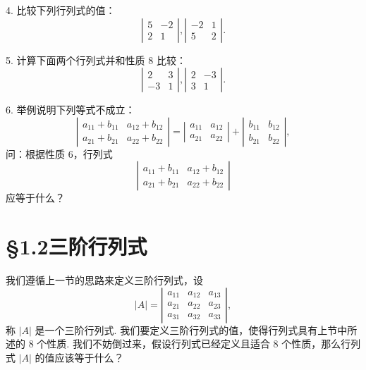 \documentclass[UTF8, 12pt, fontset=fandol, oneside]{ctexart}
\begin{document}
4. 比较下列行列式的值：
\[
\left|\begin{array}{cc}
5 & -2\\
2 & 1
\end{array}\right|,
\left|\begin{array}{cc}
-2 & 1\\
5 & 2
\end{array}\right|.
\]

5. 计算下面两个行列式并和性质 8 比较：
\[
\left|\begin{array}{cc}
2 & 3\\
-3 & 1
\end{array}\right|,
\left|\begin{array}{cc}
2 & -3\\
3 & 1
\end{array}\right|.
\]

6. 举例说明下列等式不成立：
\[
\left|\begin{array}{cc}
a_{11}+b_{11} & a_{12}+b_{12}\\
a_{21}+b_{21} & a_{22}+b_{22}
\end{array}\right|
=
\left|\begin{array}{cc}
a_{11} & a_{12}\\
a_{21} & a_{22}
\end{array}\right|
+
\left|\begin{array}{cc}
b_{11} & b_{12}\\
b_{21} & b_{22}
\end{array}\right|,
\]
问：根据性质 6，行列式
\[
\left|\begin{array}{cc}
a_{11}+b_{11} & a_{12}+b_{12}\\
a_{21}+b_{21} & a_{22}+b_{22}
\end{array}\right|
\]
应等于什么？

\section*{§1.2\quad 三阶行列式}

我们遵循上一节的思路来定义三阶行列式，设
\begin{equation}
|A|=
\left|\begin{array}{ccc}
a_{11} & a_{12} & a_{13}\\
a_{21} & a_{22} & a_{23}\\
a_{31} & a_{32} & a_{33}
\end{array}\right|,
\tag{1.2.1}
\end{equation}
称 $|A|$ 是一个三阶行列式. 我们要定义三阶行列式的值，使得行列式具有上节中所述的 8 个性质. 我们不妨倒过来，假设行列式已经定义且适合 8 个性质，那么行列式 $|A|$ 的值应该等于什么？
\end{document}
